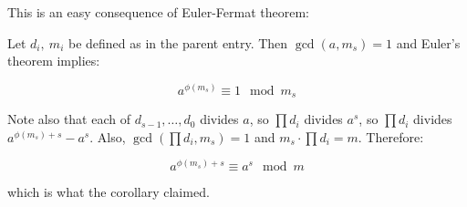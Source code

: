 \documentclass[12pt]{article}
\begin{document}
This is an easy consequence of Euler-Fermat theorem:

Let $d_i,\ m_i$ be defined as in the parent entry. Then $\gcd(a,m_s)=1$ and Euler's theorem implies:

$$a^{\phi(m_s)}\equiv 1 \mod m_s$$

Note also that each of $d_{s-1},\ldots, d_0$ divides $a$, so $\prod d_i$ divides $a^s$, so $\prod d_i$ divides $a^{\phi(m_s)+s}-a^s$. Also, $\gcd(\prod d_i,m_s)=1$
and $m_s\cdot\prod d_i =m$. Therefore:

$$a^{\phi(m_s)+s}\equiv a^s \mod m$$

which is what the corollary claimed.
\end{document}
